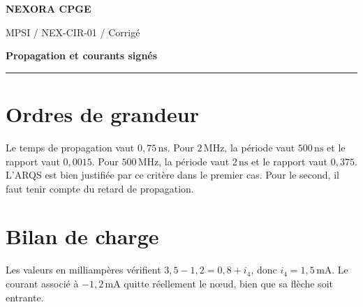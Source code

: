 \documentclass[11pt,a4paper]{article}
\begin{document}
{\small\bfseries\color{nexorablue} NEXORA CPGE}\par
{\small MPSI / NEX-CIR-01 / Corrigé}\par
{\LARGE\bfseries Propagation et courants signés}\par
\vspace{0.25em}\hrule\vspace{0.6em}

\section*{Ordres de grandeur}
Le temps de propagation vaut $0{,}75\,\mathrm{ns}$. Pour $2\,\mathrm{MHz}$, la période vaut $500\,\mathrm{ns}$ et le rapport vaut $0{,}0015$. Pour $500\,\mathrm{MHz}$, la période vaut $2\,\mathrm{ns}$ et le rapport vaut $0{,}375$. L’ARQS est bien justifiée par ce critère dans le premier cas. Pour le second, il faut tenir compte du retard de propagation.

\section*{Bilan de charge}
Les valeurs en milliampères vérifient $3{,}5-1{,}2=0{,}8+i_4$, donc $i_4=1{,}5\,\mathrm{mA}$. Le courant associé à $-1{,}2\,\mathrm{mA}$ quitte réellement le nœud, bien que sa flèche soit entrante.
\end{document}
